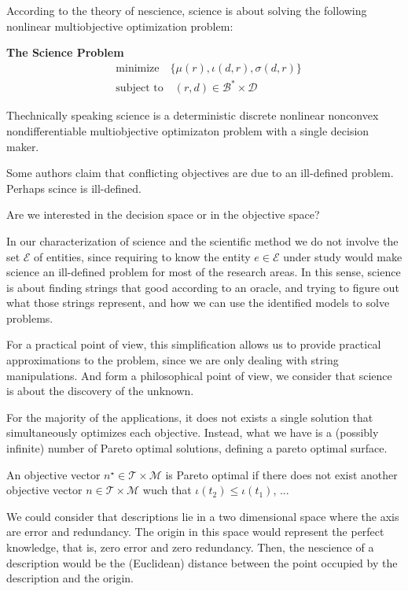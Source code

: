 According to the theory of nescience, science is about solving the following nonlinear multiobjective optimization problem:

\begin{tBox}
\textbf{The Science Problem}
\begin{align*}
 & \text{minimize} \quad \{ \mu(r), \iota(d, r), \sigma(d, r)\} \\
 & \text{subject to} \quad (r, d) \in \mathcal{B}^\ast \times \mathcal{D}
\end{align*}
\end{tBox}


{\color{red} Thechnically speaking science is a deterministic discrete nonlinear nonconvex nondifferentiable multiobjective optimizaton problem with a single decision maker.}

{\color{red} Some authors claim that conflicting objectives are due to an ill-defined problem. Perhaps scince is ill-defined.}

{\color{red} Are we interested in the decision space or in the objective space?}

In our characterization of science and the scientific method we do not involve the set $\mathcal{E}$ of entities, since requiring to know the entity $e \in \mathcal{E}$ under study would make science an ill-defined problem for most of the research areas. In this sense, science is about finding strings that good according to an oracle, and trying to figure out what those strings represent, and how we can use the identified models to solve problems.

For a practical point of view, this simplification allows us to provide practical approximations to the problem, since we are only dealing with string manipulations. And form a philosophical point of view, we consider that science is about the discovery of the unknown.

For the majority of the applications, it does not exists a single solution that simultaneously optimizes each objective. Instead, what we have is a (possibly infinite) number of Pareto optimal solutions, defining a pareto optimal surface.

\begin{definition}
An objective vector $n^\star \in \mathcal{T} \times \mathcal{M}$ is Pareto optimal if there does not exist another objective vector $n \in \mathcal{T} \times \mathcal{M}$ wuch that $\iota(t_2) \leq \iota(t_1)$, ...
\end{definition}

We could consider that descriptions lie in a two dimensional space where the axis are error and redundancy. The origin in this space would represent the perfect knowledge, that is, zero error and zero redundancy. Then, the nescience of a description would be the (Euclidean) distance between the point occupied by the description and the origin.

